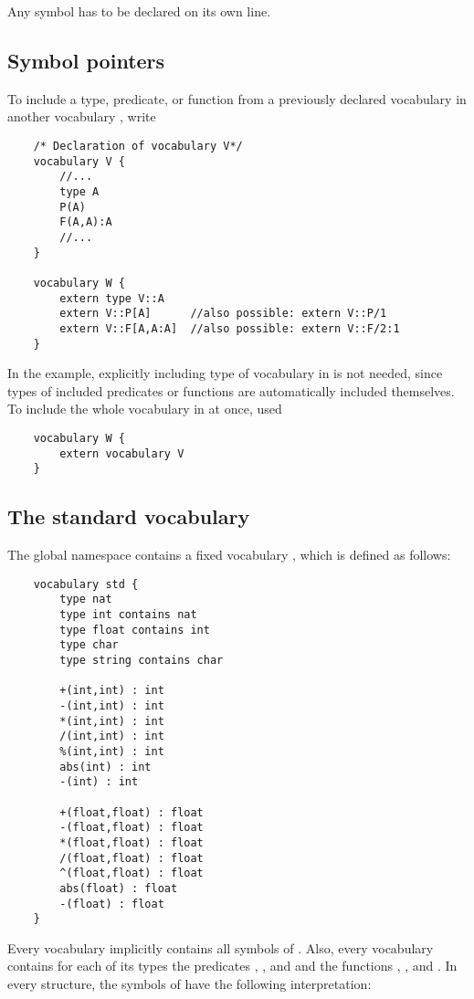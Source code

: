 Any symbol has to be declared on its own line.



\subsection{Symbol pointers}

To include a type, predicate, or function from a previously declared vocabulary  in another vocabulary , write
\begin{lstlisting}
	/* Declaration of vocabulary V*/
	vocabulary V {
		//...
		type A
		P(A)
		F(A,A):A
		//...
	}

	vocabulary W {
		extern type V::A
		extern V::P[A]		//also possible: extern V::P/1
		extern V::F[A,A:A]	//also possible: extern V::F/2:1
	}
\end{lstlisting}


In the example, explicitly including type  of vocabulary  in  is not needed, since types of included predicates or functions are automatically included themselves.  To include the whole vocabulary  in  at once, used
\begin{lstlisting}
	vocabulary W {
		extern vocabulary V
	}
\end{lstlisting}




\subsection{The standard vocabulary}

The global namespace contains a fixed vocabulary , which is defined as follows:

\begin{lstlisting}
	vocabulary std {
		type nat	
		type int contains nat
		type float contains int
		type char
		type string contains char

		+(int,int) : int
		-(int,int) : int
		*(int,int) : int
		/(int,int) : int
		%(int,int) : int
		abs(int) : int
		-(int) : int
		
		+(float,float) : float
		-(float,float) : float
		*(float,float) : float
		/(float,float) : float
		^(float,float) : float
		abs(float) : float
		-(float) : float
	}
\end{lstlisting}
Every vocabulary implicitly contains all symbols of .  Also, every vocabulary contains for each of its types  the predicates , , and  and the functions , ,  and . In every structure, the symbols of  have the following interpretation:

